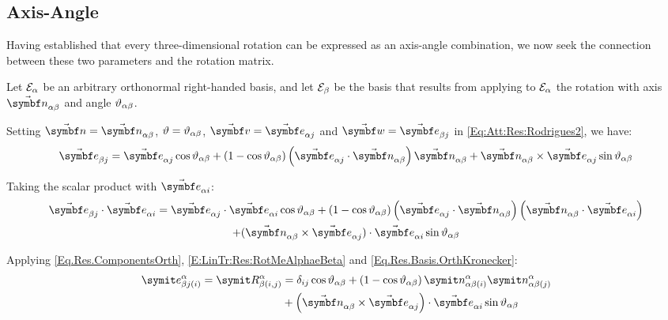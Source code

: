 \subsection{Axis-Angle} \label{AxAng}

Having established that every three-dimensional rotation can be expressed as an axis-angle combination, we now seek the connection between these two parameters and the rotation matrix.

Let $\basis[\alpha]$ be an arbitrary orthonormal right-handed basis, and let $\basis[\beta]$ be the basis that results from applying to $\basis[\alpha]$ the rotation with axis $\varel{\rotax}{\alpha}{\beta}$ and angle $\rel{\rotang}{\alpha}{\beta}$.

Setting $\vabs{\rotax}=\varel{\rotax}{\alpha}{\beta}$, $\rotang =\rel{\rotang}{\alpha}{\beta}$, $\vabs{v}=\vasub{\bv}{\alpha j}$ and $\vabs{w}=\vasub{\bv}{\beta j}$ in \eqref{Eq:Att:Res:Rodrigues2}, we have:
\begin{equation*}
	\vasub{\bv}{\beta j} = \vasub{\bv}{\alpha j} \cos \rel{\rotang}{\alpha}{\beta} + (1-\cos \rel{\rotang}{\alpha}{\beta}) \rndp{\vasub{\bv}{\alpha j} \cdot \varel{\rotax}{\alpha}{\beta}} \varel{\rotax}{\alpha}{\beta} + \varel{\rotax}{\alpha}{\beta} \times \vasub{\bv}{\alpha j} \sin \rel{\rotang}{\alpha}{\beta}
\end{equation*}

Taking the scalar product  with $\vasub{\bv}{\alpha i}$:
\begin{gather*}
\vasub{\bv}{\beta j} \cdot \vasub{\bv}{\alpha i} = \vasub{\bv}{\alpha j} \cdot \vasub{\bv}{\alpha i} \cos \rel{\rotang}{\alpha}{\beta} + (1-\cos \rel{\rotang}{\alpha}{\beta}) \rndp{\vasub{\bv}{\alpha j} \cdot \varel{\rotax}{\alpha}{\beta}} \rndp{\varel{\rotax}{\alpha}{\beta} \cdot \vasub{\bv}{\alpha i}} \\
+ (\varel{\rotax}{\alpha}{\beta} \times \vasub{\bv}{\alpha j}) \cdot \vasub{\bv}{\alpha i} \sin \rel{\rotang}{\alpha}{\beta}
\end{gather*}

Applying \eqref{Eq.Res.ComponentsOrth}, \eqref{E:LinTr:Res:RotMeAlphaeBeta} and \eqref{Eq.Res.Basis.OrthKronecker}:
\begin{equation} \label{Eq.Deriv.RotMat.AxisAngle.EBetaEAlpha}
\begin{split}
\csubprj{\bv}{\beta j}{\alpha}{i} = \cRotM{\alpha}{\beta}{i,j}
&= \delta_{ij} \cos \rel{\rotang}{\alpha}{\beta} + \rndp{1-\cos \rel{\rotang}{\alpha}{\beta}} \crelprj{\rotax}{\alpha}{\beta}{\alpha}{i} \crelprj{\rotax}{\alpha}{\beta}{\alpha}{j}  \\
&+ \rndp{ \varel{\rotax}{\alpha}{\beta} \times \vasub{\bv}{\alpha j}}  \cdot \vasub{\bv}{\alpha i} \sin \rel{\rotang}{\alpha}{\beta}
\end{split}
\end{equation}

